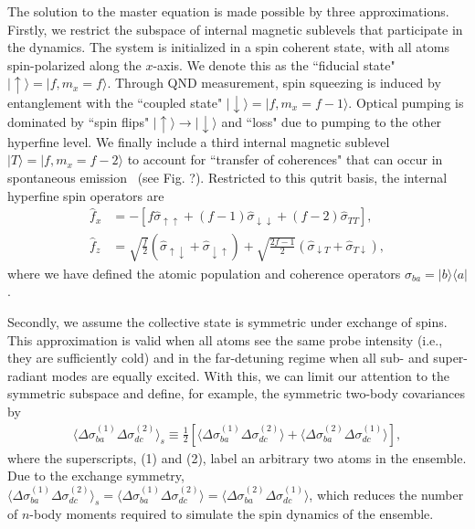 \documentclass[preprint,aps,pra,onecolumn,superscriptaddress]{revtex4-1} %
\def\bra#1{\langle{#1}\rvert}%
\def\ket#1{\lvert{#1}\rangle}%
\newcommand{\expect}[1]{\big\langle #1 \big\rangle}
\begin{document}
The solution to the master equation is made possible by three approximations. Firstly, we restrict the subspace of internal magnetic sublevels that participate in the dynamics.  The system is initialized in a spin coherent state, with all atoms spin-polarized along the $x$-axis.  We denote this as the ``fiducial state" $\ket{\uparrow} = \ket{f, m_x =f}$.   Through QND measurement, spin squeezing is induced by entanglement with the  ``coupled state"  $\ket{\downarrow} = \ket{f, m_x=f-1}$.  Optical pumping is dominated by ``spin flips" $\ket{\uparrow}\rightarrow \ket{\downarrow}$ and ``loss" due to pumping to the other hyperfine level.  We finally include a third internal magnetic sublevel $\ket{T} = \ket{f, m_x=f-2}$ to account for  ``transfer of coherences" that can occur in spontaneous emission~\cite{Norris2012Enhanced,Norris2014} (see Fig. ?).  Restricted to this qutrit basis, the internal hyperfine spin operators are
\begin{subequations}\label{eq:fxfz_xbasis}
\begin{align}
\hat{f}_x &= -\left[f \hat{\sigma}_{\uparrow \uparrow} +(f-1) \hat{\sigma}_{\downarrow \downarrow} + (f-2)  \hat{\sigma}_{T T}\right], \\
\hat{f}_z &= \sqrt{\frac{f}{2}} \left(\hat{\sigma}_{\uparrow \downarrow} + \hat{\sigma}_{\downarrow \uparrow}\right) + \sqrt{\frac{2f-1}{2}}  \left(\hat{\sigma}_{\downarrow T} + \hat{\sigma}_{T \downarrow }\right),
\end{align}
\end{subequations}
where we have defined the atomic population and coherence operators $\hat{\sigma}_{ba}=\ket{b}\bra{a}$.

Secondly, we assume the collective state is symmetric under exchange of spins. This approximation is valid when all atoms see the same probe intensity (i.e., they are sufficiently cold) and in the far-detuning regime when all sub- and super-radiant modes are equally excited. With this, we can limit our attention to the symmetric subspace and define, for example, the symmetric two-body covariances by
\begin{align}
\expect{\Delta\sigma_{ba}^{(1)}\Delta\sigma_{dc}^{(2)}}_s \equiv \frac{1}{2}\left[\expect{\Delta\sigma_{ba}^{(1)}\Delta\sigma_{dc}^{(2)}}+\expect{\Delta\sigma_{ba}^{(2)}\Delta\sigma_{dc}^{(1)}} \right] ,
\end{align}
where the superscripts, (1) and (2), label an arbitrary two atoms in the ensemble. Due to the exchange symmetry, $ \expect{\Delta\sigma_{ba}^{(1)}\Delta\sigma_{dc}^{(2)}}_s=\expect{\Delta\sigma_{ba}^{(1)}\Delta\sigma_{dc}^{(2)}}=\expect{\Delta\sigma_{ba}^{(2)}\Delta\sigma_{dc}^{(1)}} $, which reduces the number of $ n $-body moments required to simulate the spin dynamics of the ensemble.
\end{document}
